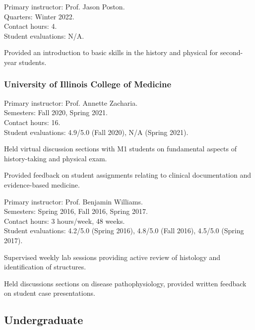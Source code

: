 \documentclass{komacv}
\begin{document}
{Primary instructor: Prof. Jason Poston.\\
Quarters: Winter 2022.\\
Contact hours: 4.\\
Student evaluations: N/A.
\begin{compactitem}
\item Provided an introduction to basic skills in the history and physical for second-year students.
\end{compactitem}}

\subsubsection{University of Illinois College of Medicine}

{Primary instructor: Prof. Annette Zacharia.\\
Semesters: Fall 2020, Spring 2021.\\
Contact hours: 16.\\
Student evaluations: 4.9/5.0 (Fall 2020), N/A (Spring 2021).
\begin{compactitem}
\item Held virtual discussion sections with M1 students on fundamental aspects of history-taking and physical exam.
\item Provided feedback on student assignments relating to clinical documentation and evidence-based medicine.
\end{compactitem}}

{Primary instructor: Prof. Benjamin Williams.\\
Semesters: Spring 2016, Fall 2016, Spring 2017.\\
Contact hours: 3 hours/week, 48 weeks.\\
Student evaluations: 4.2/5.0 (Spring 2016), 4.8/5.0 (Fall 2016), 4.5/5.0 (Spring 2017).
\begin{compactitem}
\item Supervised weekly lab sessions providing active review of histology and identification of structures.
\item Held discussions sections on disease pathophysiology, provided written feedback on student case presentations.
\end{compactitem}}

\subsection{Undergraduate}
\end{document}
